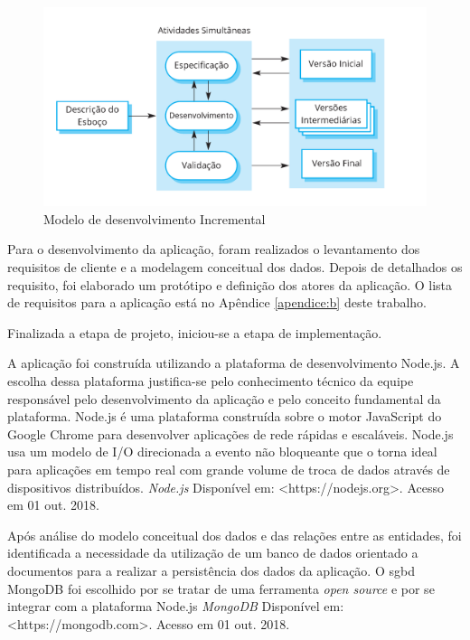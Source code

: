 \begin{figure}[!ht]
    \centering
    \includegraphics[scale=0.20]{./figuras/modelo_incremental.png}
    \caption{Modelo de desenvolvimento Incremental }
    \label{fig:modelo-incremental}
\end{figure}

\par
Para o desenvolvimento da aplicação, foram realizados o levantamento dos requisitos de cliente e a modelagem conceitual dos dados.
Depois de detalhados os requisito, foi elaborado um protótipo e definição dos atores da aplicação. O lista de requisitos para a aplicação está no Apêndice \ref{apendice:b} deste trabalho. 

\par
Finalizada a etapa de projeto, iniciou-se a etapa de implementação. 

A aplicação foi construída utilizando a plataforma de desenvolvimento Node.js. A escolha dessa plataforma justifica-se pelo conhecimento técnico da equipe
responsável pelo desenvolvimento da aplicação e pelo conceito fundamental da plataforma. Node.js é uma plataforma construída sobre o motor JavaScript do 
Google Chrome para desenvolver aplicações de rede rápidas e escaláveis. Node.js usa um modelo de I/O direcionada a evento não bloqueante que o torna
ideal para aplicações em tempo real com grande volume de troca de dados através de dispositivos distribuídos. 
\textit{Node.js} Disponível em: <https://nodejs.org>. Acesso em 01 out. 2018.

\par
Após análise do modelo conceitual dos dados e das relações entre as entidades, foi identificada a necessidade da utilização de um banco de dados orientado a documentos para a 
realizar a persistência dos dados da aplicação. 
O \acrfull{sgbd} MongoDB foi escolhido por se tratar de uma ferramenta \textit{open source} e por se integrar com a plataforma Node.js 
\textit{MongoDB} Disponível em: <https://mongodb.com>. Acesso em 01 out. 2018.

